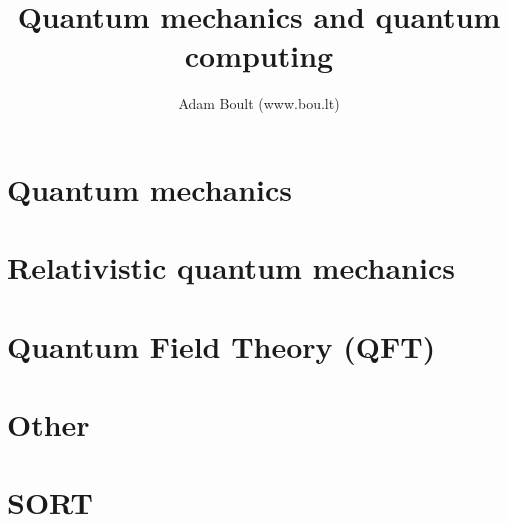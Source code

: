 \documentclass[oneside]{book}
\begin{document}
\author{Adam Boult (www.bou.lt)}
\title{Quantum mechanics and quantum computing}
\maketitle

\setcounter{tocdepth}{0}
\tableofcontents



\part{Quantum mechanics}



\part{Relativistic quantum mechanics}


\part{Quantum Field Theory (QFT)}


\part{Other}


\part{SORT}

\end{document}
